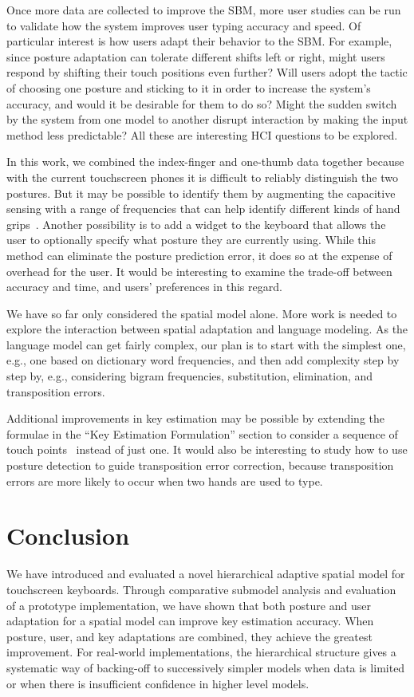 \documentclass{sigchi}
\begin{document}
Once more data are collected to improve the SBM, more user studies can be run to validate how the system improves user typing
accuracy and speed. Of particular interest is how users
adapt their behavior to the SBM. For example, since posture adaptation
can tolerate different shifts left or right, might users respond by shifting their touch positions even further? Will users adopt the
tactic of choosing one posture and sticking to it in order to increase the system's
accuracy, and would it be desirable for them to do so? Might the sudden switch
by the system from one model to another disrupt interaction by making the input
method less predictable? All these are interesting HCI questions to be explored.

In this work, we combined the index-finger and one-thumb data together because
with the current touchscreen phones it is difficult to reliably
distinguish the two postures. But it may be possible to identify them by augmenting the
capacitive sensing with a range of frequencies that can help identify different kinds of
hand grips~\cite{Sato:2012}. Another possibility is to add a widget to the
keyboard that allows the user to optionally specify what posture they are
currently using. While this method can eliminate the posture
prediction error, it does so at the expense of overhead for the user. It would be interesting
to examine the trade-off between accuracy and time,
and users' preferences in this regard.

We have so far only considered the spatial model alone. More work is needed
to explore the interaction between spatial adaptation and language modeling.
As the language model can get fairly complex, our plan is to start with the
simplest one, e.g., one based on dictionary word frequencies, and then add
complexity step by step by, e.g., considering bigram frequencies, substitution,
elimination, and transposition errors.

Additional improvements in key estimation may be possible by extending the formulae in the ``Key Estimation Formulation'' section to consider a
sequence of touch points~\cite{Goodman:2002, Gunawardana:2010} instead of just one.
It would also be interesting to study how to use posture detection to guide
transposition error correction, because transposition errors are more likely to
occur when two hands are used to type.

\section{Conclusion}
We have introduced and evaluated a novel hierarchical adaptive spatial model for
touchscreen keyboards. Through comparative submodel analysis and evaluation of a prototype implementation, we have shown that both posture and user adaptation for a spatial model can improve key estimation accuracy. When posture, user, and key adaptations are combined, they
achieve the greatest improvement. For real-world
implementations, the
hierarchical structure gives a systematic way of backing-off to successively simpler models  when data is limited
or when there is insufficient confidence in higher level models.
\end{document}

